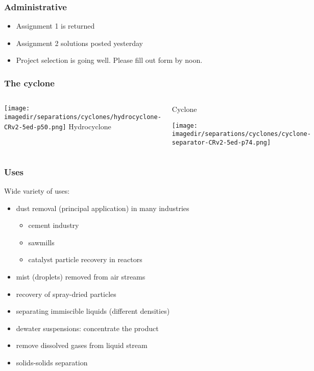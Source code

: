 
\begin{frame}\frametitle{Administrative}
	\begin{itemize}
		\item	Assignment 1 is returned
		\item	Assignment 2 solutions posted yesterday
		\item	Project selection is going well. Please fill out form by {} noon.
	\end{itemize}
\end{frame} 

\begin{frame}\frametitle{The cyclone}
	\vspace{-24pt}
	\begin{columns}[b]
			\begin{center}
				\texttt{[image: \\imagedir/separations/cyclones/hydrocyclone-CRv2-5ed-p50.png]}
				Hydrocyclone
			\end{center}
			\begin{center}
				Cyclone
				\vspace{12pt}
				
				\texttt{[image: \\imagedir/separations/cyclones/cyclone-separator-CRv2-5ed-p74.png]}
			\end{center}
	\end{columns}
\end{frame}

\begin{frame}\frametitle{Uses}
	Wide variety of uses:
	\begin{itemize}
		\item	dust removal (principal application) in many industries
			\begin{itemize}
				\item	cement industry
				\item	sawmills
				\item	catalyst particle recovery in reactors
			\end{itemize}
		\item	mist (droplets) removed from air streams
		\item	recovery of spray-dried particles
		\item	separating immiscible liquids (different densities)
		\item	dewater suspensions: concentrate the product
		\item	remove dissolved gases from liquid stream
		\item	solids-solids separation
	\end{itemize}
\end{frame}

